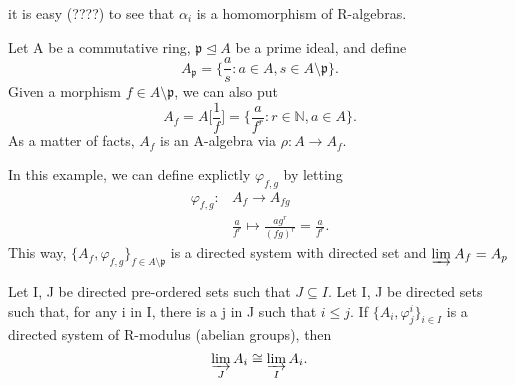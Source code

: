 \documentclass[../category_theory.tex]{subfiles}
\begin{document}
it is easy (????) to see that \(\alpha_{i}\) is a homomorphism of R-algebras.
\begin{example}
	Let A be a commutative ring, \(\mathfrak{p}\trianglelefteq A\) be a prime ideal, and define
	\[
		A_{\mathfrak{p}}=\biggl\{ \frac{a}{s}: a\in A, s\in A\setminus{\mathfrak{p}}\biggr\}.
	\]
	Given a morphism \(f\in A\setminus{\mathfrak{p}}\), we can also put
	\[
		A_{f}=A\biggl[\frac{1}{f}\biggr]=\biggl\{\frac{a}{f^{r}}: r\in \mathbb{N}, a\in A\biggr\}.
	\]
	As a matter of facts, \(A_{f}\) is an A-algebra via \(\rho :A\rightarrow A_{f}\).

	In this example, we can define explictly \(\varphi_{f, g} \) by letting
	\begin{align*}
		\varphi_{f, g}: & A_{f}\rightarrow A_{fg}                                         \\
		                & \frac{a}{f^{r}}\mapsto \frac{ag^{r}}{(fg)^{r}}=\frac{a}{f^{r}}.
	\end{align*}
	This way, \(\{A_{f}, \varphi_{f, g}\}_{f\in A\setminus{\mathfrak{p}}}\) is a directed system with directed set and \(\varinjlim_{}A_{f}=A_{p}\)
\end{example}
\begin{prop*}
	Let I, J be directed pre-ordered sets such that \(J\subseteq I\). Let I, J be directed sets such that, for any i in I, there is a j in J such that \(i\leq j\). If \(\{A_{i}, \varphi_{j}^{i}\}_{i\in I}\) is a directed system of R-modulus (abelian groups), then
	\[
		\varinjlim_{J}A_{i}\cong \varinjlim_{I}A_{i}.
	\]
\end{prop*}
\end{document}

